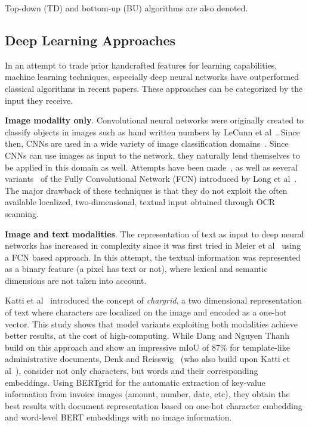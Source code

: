 \documentclass[english, bibtex]{kththesis}
\begin{document}
\begin{center}
Top-down (TD) and bottom-up (BU) algorithms are also denoted.
\end{center}

\subsection{Deep Learning Approaches}

In an attempt to trade prior handcrafted features for learning capabilities, machine learning techniques, especially deep neural networks have outperformed classical algorithms in recent papers. These approaches can be categorized by the input they receive.

\textbf{Image modality only}. Convolutional neural networks were originally created to classify objects in images such as hand written numbers by LeCunn et al~\cite{lecun1989}. Since then, CNNs are used in a wide variety of image classification domains~\cite{deng2009}. Since CNNs can use images as input to the network, they naturally lend themselves to be applied in this domain as well. Attempts have been made~\cite{DBLP:journals/corr/0011S17}, as well as several variants~\cite{he2017, xu2017, wickpuppe2018, oliveira2018} of the Fully Convolutional Network (FCN) introduced by Long et al~\cite{DBLP:journals/corr/LongSD14}. The major drawback of these techniques is that they do not exploit the often available localized, two-dimensional, textual input obtained through OCR scanning.  

\textbf{Image and text modalities}. The representation of text as input to deep neural networks has increased in complexity since it was first tried in Meier et al~\cite{8270006} using a FCN based approach. In this attempt, the textual information was represented as a binary feature (a pixel has text or not), where lexical and semantic dimensions are not taken into account. 

Katti et al~\cite{katti2018} introduced the concept of \textit{chargrid}, a two dimensional representation of text where characters are localized on the image and encoded as a one-hot vector. This study shows that model variants exploiting both modalities achieve better results, at the cost of high-computing. While Dang and Nguyen Thanh~\cite{DBLP:journals/corr/abs-2106-00952} build on this approach and show an impressive mIoU of 87\% for template-like administrative documents, Denk and Reisswig~\cite{DBLP:journals/corr/abs-1909-04948} (who also build upon Katti et al~\cite{katti2018}), consider not only characters, but words and their corresponding embeddings. Using BERTgrid for the automatic extraction of key-value information from invoice images (amount, number, date, etc), they obtain the best results with document representation based on one-hot character embedding and word-level BERT embeddings with no image information.
\end{document}
